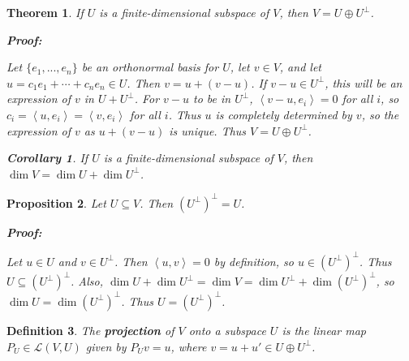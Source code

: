 \documentclass{article}
\theoremstyle{colontheorem}
\newtheorem{theorem}{Theorem}[section]
\newtheorem{proposition}[theorem]{Proposition}
\newtheorem{definition}[theorem]{Definition}
\newtheorem{corollary}{Corollary}[theorem]
\newenvironment{Theorem}
{
	\begin{mdframed}[backgroundcolor=TheoremOrange!10]
	\begin{theorem}
}
{
	\end{theorem}
	\end{mdframed}
	
	\vspace{.15in}
}
\newenvironment{Proposition}
{
	\begin{mdframed}[backgroundcolor=TheoremOrange!10]
	\begin{proposition}
}
{
	\end{proposition}
	\end{mdframed}
	
	\vspace{.15in}
}
\newenvironment{Def}
{
	\begin{mdframed}[backgroundcolor=DefGreen!10]
	\begin{definition}
}
{
	\end{definition}
	\end{mdframed}
	
	\vspace{.15in}
}
\newenvironment{Corollary}
{
	\begin{mdframed}[backgroundcolor=CorollaryBlue!10]
	\begin{corollary}
}
{
	\end{corollary}
	\end{mdframed}
	
	\vspace{.09in}
}
\newenvironment{Proof}
{
	\begin{mdframed}[backgroundcolor=ProofPurple!10]
	\textbf{Proof:}%
}
{
	\end{mdframed}
	
	\vspace{.085in}
}
\begin{document}
\begin{Theorem}
	
	If $U$ is a finite-dimensional subspace of $V$, then $V = U \oplus U^\perp$.
	
	\begin{Proof}
		Let $\{e_1, ..., e_n\}$ be an orthonormal basis for $U$, let $v \in V$, and let $u = c_1 e_1 + \cdots + c_n e_n \in U$. Then $v = u + (v - u)$. If $v - u \in U^\perp$, this will be an expression of $v$ in $U + U^\perp$. For $v - u$ to be in $U^\perp$, $\left< v-u, e_i \right> = 0$ for all $i$, so $c_i = \left< u, e_i \right> = \left< v, e_i \right>$ for all $i$. Thus $u$ is completely determined by $v$, so the expression of $v$ as $u + (v - u)$ is unique. Thus $V = U \oplus U^\perp$.
		
	\end{Proof}
	
	\begin{Corollary}
		
		If $U$ is a finite-dimensional subspace of $V$, then $\dim V = \dim U + \dim U^\perp$.
		
	\end{Corollary}
	
\end{Theorem}



\begin{Proposition}
	
	Let $U \subseteq V$. Then $(U^\perp)^\perp = U$.
	
	\begin{Proof}
		Let $u \in U$ and $v \in U^\perp$. Then $\left< u, v \right> = 0$ by definition, so $u \in (U^\perp)^\perp$. Thus $U \subseteq (U^\perp)^\perp$. Also, $\dim U + \dim U^\perp = \dim V = \dim U^\perp + \dim (U^\perp)^\perp$, so $\dim U = \dim (U^\perp)^\perp$. Thus $U = (U^\perp)^\perp$.
		
	\end{Proof}
	
\end{Proposition}



\begin{Def}
	
	The \textbf{projection} of $V$ onto a subspace $U$ is the linear map $P_U \in \mathcal{L}(V, U)$ given by $P_U v = u$, where $v = u + u' \in U \oplus U^\perp$.
	
\end{Def}
\end{document}
